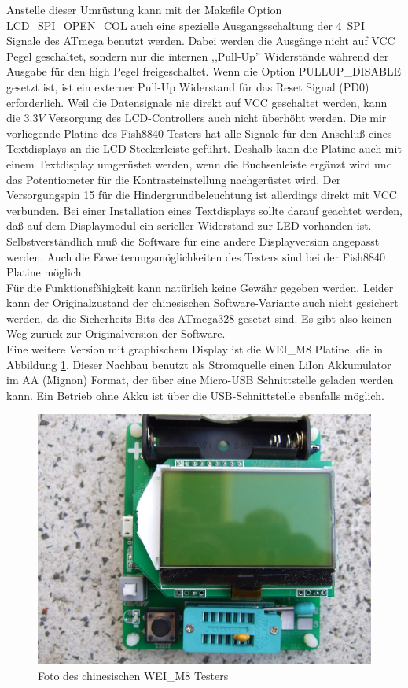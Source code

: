 Anstelle dieser Umrüstung kann mit der Makefile Option LCD\_SPI\_OPEN\_COL auch eine spezielle Ausgangsschaltung
der 4~SPI Signale des ATmega benutzt werden.
Dabei werden die Ausgänge nicht auf VCC Pegel geschaltet,
sondern nur die internen ,,Pull-Up'' Widerstände während der Ausgabe für den high Pegel freigeschaltet.
Wenn die Option PULLUP\_DISABLE gesetzt ist, ist ein externer Pull-Up Widerstand für das
Reset Signal (PD0) erforderlich.
Weil die Datensignale nie direkt auf VCC geschaltet werden, kann die \(3.3V\) Versorgung des LCD-Controllers
auch nicht überhöht werden.
Die mir vorliegende Platine des Fish8840 Testers hat alle Signale für den Anschluß eines
Textdisplays an die LCD-Steckerleiste geführt. 
Deshalb kann die Platine auch mit einem Textdisplay umgerüstet werden, wenn die Buchsenleiste
ergänzt wird und das Potentiometer für die Kontrasteinstellung nachgerüstet wird.
Der Versorgungspin 15 für die Hindergrundbeleuchtung ist allerdings direkt mit VCC verbunden.
Bei einer Installation eines Textdisplays sollte darauf geachtet werden, daß auf dem Displaymodul
ein serieller Widerstand zur LED vorhanden ist.
Selbstverständlich muß die Software für eine andere Displayversion angepasst werden.
Auch die Erweiterungsmöglichkeiten des Testers sind bei der Fish8840 Platine möglich.\\

Für die Funktionsfähigkeit kann natürlich keine Gewähr gegeben werden.
Leider kann der Originalzustand der chinesischen Software-Variante auch nicht gesichert werden,
da die Sicherheits-Bits des ATmega328 gesetzt sind.
Es gibt also keinen Weg zurück zur Originalversion der Software.\\ 

Eine weitere Version mit graphischem Display ist die WEI\_M8 Platine, die in Abbildung \ref{fig:WeiM8}.
Dieser Nachbau benutzt als Stromquelle einen LiIon Akkumulator im AA (Mignon) Format, der über
eine Micro-USB Schnittstelle geladen werden kann. Ein Betrieb ohne Akku ist über die USB-Schnittstelle
ebenfalls möglich.

\begin{figure}[H]
\centering
\includegraphics[width=12cm]{../PNG/WEI_M8.JPG}
\caption{Foto des chinesischen WEI\_M8 Testers}
\label{fig:WeiM8}
\end{figure}

